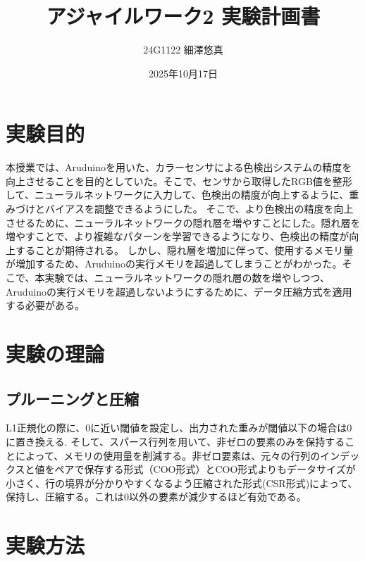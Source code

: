 \documentclass[uplatex,dvipdfmx]{jsarticle}
\begin{document}
\title{アジャイルワーク2 実験計画書}
\author{24G1122 細澤悠真}
\date{2025年10月17日}
\maketitle
\rmfamily\mcfamily %

\section{実験目的}
本授業では、Aruduinoを用いた、カラーセンサによる色検出システムの精度を向上させることを目的としていた。そこで、センサから取得したRGB値を整形して、ニューラルネットワークに入力して、色検出の精度が向上するように、重みづけとバイアスを調整できるようにした。
そこで、より色検出の精度を向上させるために、ニューラルネットワークの隠れ層を増やすことにした。隠れ層を増やすことで、より複雑なパターンを学習できるようになり、色検出の精度が向上することが期待される。
しかし、隠れ層を増加に伴って、使用するメモリ量が増加するため、Aruduinoの実行メモリを超過してしまうことがわかった。そこで、本実験では、ニューラルネットワークの隠れ層の数を増やしつつ、Aruduinoの実行メモリを超過しないようにするために、データ圧縮方式を適用する必要がある。
\section{実験の理論}
\subsection{プルーニングと圧縮} %
L1正規化の際に、0に近い閾値を設定し、出力された重みが閾値以下の場合は0に置き換える.
そして、スパース行列を用いて、非ゼロの要素のみを保持することによって、メモリの使用量を削減する。非ゼロ要素は、元々の行列のインデックスと値をペアで保存する形式（COO形式）とCOO形式よりもデータサイズが小さく、行の境界が分かりやすくなるよう圧縮された形式(CSR形式)によって、保持し、圧縮する。これは0以外の要素が減少するほど有効である。

\section{実験方法}
\end{document}
